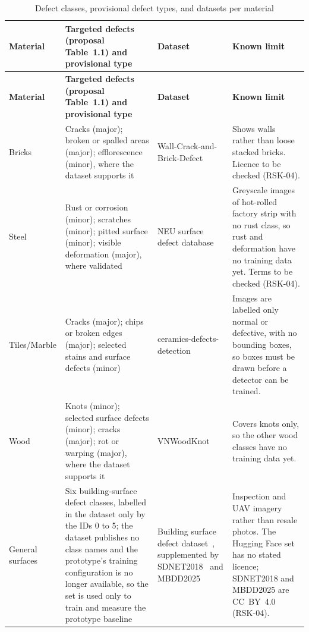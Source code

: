 {\footnotesize
\begin{longtable}{@{}>{\raggedright\arraybackslash}p{}>{\raggedright\arraybackslash}p{}>{\raggedright\arraybackslash}p{}>{\raggedright\arraybackslash}p{}@{}}
\caption{Defect classes, provisional defect types, and datasets per material}\label{tab:defect-classes}\\
\toprule
\textbf{Material} & \textbf{Targeted defects (proposal Table~1.1) and provisional type} & \textbf{Dataset} & \textbf{Known limit} \\
\midrule
\endfirsthead
\toprule
\textbf{Material} & \textbf{Targeted defects (proposal Table~1.1) and provisional type} & \textbf{Dataset} & \textbf{Known limit} \\
\midrule
\endhead
Bricks & Cracks (major); broken or spalled areas (major); efflorescence (minor), where the dataset supports it & Wall-Crack-and-Brick-Defect~\citep{wallcrackbrickdefect} & Shows walls rather than loose stacked bricks. Licence to be checked (RSK-04). \\
Steel & Rust or corrosion (minor); scratches (minor); pitted surface (minor); visible deformation (major), where validated & NEU surface defect database~\citep{song2013neu} & Greyscale images of hot-rolled factory strip with no rust class, so rust and deformation have no training data yet. Terms to be checked (RSK-04). \\
Tiles/\allowbreak Marble & Cracks (major); chips or broken edges (major); selected stains and surface defects (minor) & ceramics-defects-detection~\citep{ceramicsdefects} & Images are labelled only normal or defective, with no bounding boxes, so boxes must be drawn before a detector can be trained. \\
Wood & Knots (minor); selected surface defects (minor); cracks (major); rot or warping (major), where the dataset supports it & VNWoodKnot~\citep{vnwoodknot} & Covers knots only, so the other wood classes have no training data yet. \\
General surfaces & Six building-surface defect classes, labelled in the dataset only by the IDs 0 to 5; the dataset publishes no class names and the prototype's training configuration is no longer available, so the set is used only to train and measure the prototype baseline & Building surface defect dataset~\citep{buildingsurfacedefect}, supplemented by SDNET2018~\citep{sdnet2018} and MBDD2025~\citep{mbdd2025} & Inspection and UAV imagery rather than resale photos. The Hugging Face set has no stated licence; SDNET2018 and MBDD2025 are CC~BY~4.0 (RSK-04). \\
\bottomrule
\end{longtable}
}

